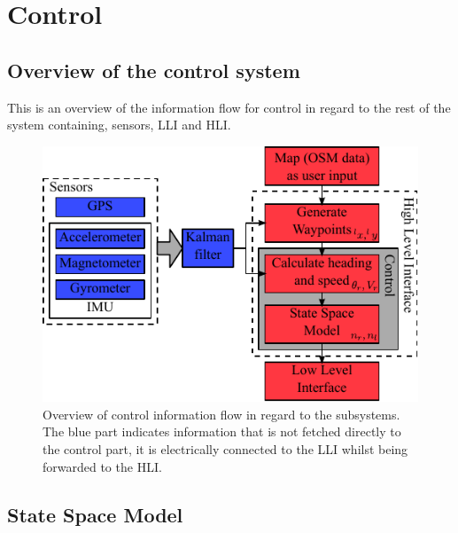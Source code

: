 \chapter{Control}
\label{chap:control}

\section{Overview of the control system}
This is an overview of the information flow for control in regard to the rest of the system containing, sensors, \ac{LLI} and \ac{HLI}.

\begin{figure}[htbp]
	\centering
	\includegraphics[width=\textwidth]{img/vessel-block-overview}
	\caption{Overview of control information flow in regard to the subsystems. The blue part indicates information that is not fetched directly to the control part, it is electrically connected to the \ac{LLI} whilst being forwarded to the \ac{HLI}.}
	\label{fig:vessel-block-overview}
\end{figure}




\section{State Space Model}




